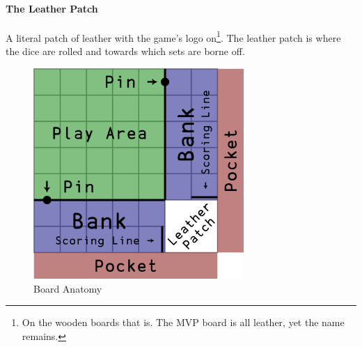 \paragraph{The Leather Patch} A literal patch of leather with the game's logo on\footnote{On the wooden boards that is. The MVP board is all leather, yet the name remains.}.
The leather patch is where the dice are rolled and towards which sets are borne off.
\begin{figure}[!h]
    \centering
    \includegraphics[width=8cm]{../graphics/zones}
    \caption{Board Anatomy}
    \label{fig:board-anatomy}
\end{figure}